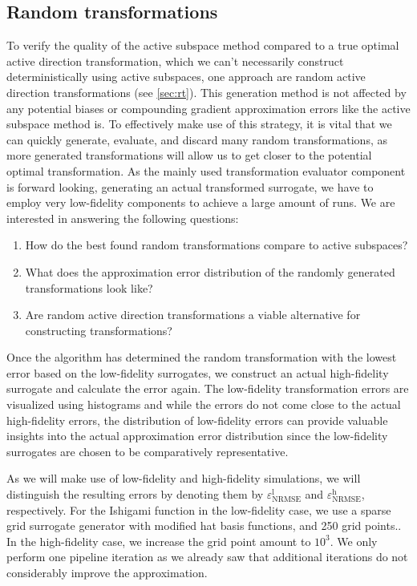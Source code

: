 \documentclass[
  a4paper,  %
  twoside,  %
  bibliography=totoc,
  headsepline,
  cleardoublepage=empty,
  parskip=half,
  draft=false
]{scrbook}
\begin{document}
\subsection{Random transformations}

To verify the quality of the active subspace method compared to a true optimal active direction transformation, which we can't necessarily construct deterministically using active subspaces, one approach are random active direction transformations (see \cref{sec:rt}).
This generation method is not affected by any potential biases or compounding gradient approximation errors like the active subspace method is.
To effectively make use of this strategy, it is vital that we can quickly generate, evaluate, and discard many random transformations, as more generated transformations will allow us to get closer to the potential optimal transformation.
As the mainly used transformation evaluator component is forward looking, \ie generating an actual transformed surrogate, we have to employ very low-fidelity components to achieve a large amount of runs.
We are interested in answering the following questions:
\begin{enumerate}
\item How do the best found random transformations compare to active subspaces?
\item What does the approximation error distribution of the randomly generated transformations look like?
\item Are random active direction transformations a viable alternative for constructing transformations?
\end{enumerate}
%
Once the algorithm has determined the random transformation with the lowest error based on the low-fidelity surrogates, we construct an actual high-fidelity surrogate and calculate the error again.
The low-fidelity transformation errors are visualized using histograms and while the errors do not come close to the actual high-fidelity errors, the distribution of low-fidelity errors can provide valuable insights into the actual approximation error distribution since the low-fidelity surrogates are chosen to be comparatively representative.

As we will make use of low-fidelity and high-fidelity simulations, we will distinguish the resulting errors by denoting them by $\varepsilon^\mathrm{l}_{\mathrm{NRMSE}}$ and $\varepsilon^\mathrm{h}_{\mathrm{NRMSE}}$, respectively.
For the Ishigami function in the low-fidelity case, we use a sparse grid surrogate generator with modified hat basis functions, and 250 grid points..
In the high-fidelity case, we increase the grid point amount to $10^3$.
We only perform one pipeline iteration as we already saw that additional iterations do not considerably improve the approximation.
\end{document}
